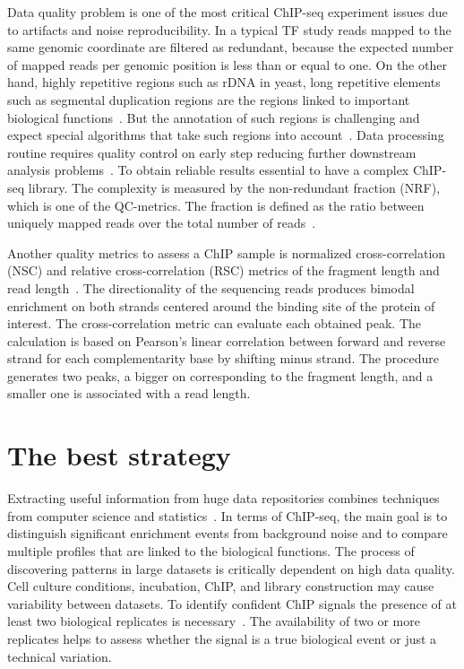 Data quality problem is one of the most critical ChIP-seq experiment issues due to artifacts and noise reproducibility.
In a typical TF study reads mapped to the same genomic coordinate are filtered as redundant, because the expected number of mapped reads per genomic position is less than or equal to one. 
On the other hand, highly repetitive regions such as rDNA in yeast, long repetitive elements such as segmental duplication regions are the regions linked to important biological functions~\cite{nakato2017recent}. But the annotation of such regions is challenging and expect special algorithms that take such regions into account~\cite{chung2011discovering}.
Data processing routine requires quality control on early step reducing further downstream analysis problems~\cite{ewels2016multiqc}.
To obtain reliable results essential to have a complex ChIP-seq library.
The complexity is measured by the non-redundant fraction (NRF), which is one of the QC-metrics.
The fraction is defined as the ratio between uniquely mapped reads over the total number of reads~\cite{landt2012chip}.

Another quality metrics to assess a ChIP sample is normalized cross-correlation (NSC) and relative cross-correlation (RSC) metrics of the fragment length and read length~\cite{landt2012chip, marinov2014large}. 
The directionality of the sequencing reads produces bimodal enrichment on both strands centered around the binding site of the protein of interest. 
The cross-correlation metric can evaluate each obtained peak. 
The calculation is based on Pearson's linear correlation between forward and reverse strand for each complementarity base by shifting minus strand. 
The procedure generates two peaks, a bigger on corresponding to the fragment length, and a smaller one is associated with a read length. 



\section{The best strategy}
\label{strategy}

Extracting useful information from huge data repositories combines techniques from computer science and statistics~\cite{friedman2001elements}. 
In terms of ChIP-seq, the main goal is to distinguish significant enrichment events from background noise and to compare multiple profiles that are linked to the biological functions. 
The process of discovering patterns in large datasets is critically dependent on high data quality. 
Cell culture conditions, incubation, ChIP, and library construction may cause variability between datasets. 
To identify confident ChIP signals the presence of at least two biological replicates is necessary~\cite{kidder2011chip}. 
The availability of two or more replicates helps to assess whether the signal is a true biological event or just a technical variation. 

